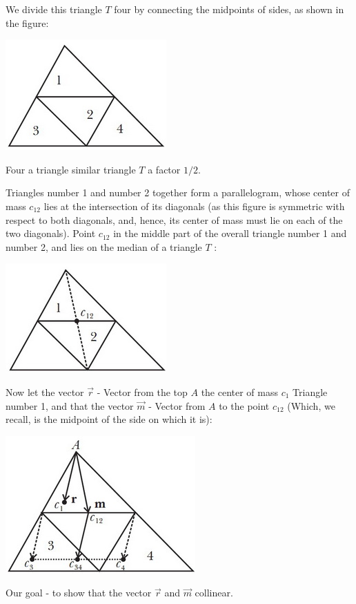 We divide this triangle $T$ four by connecting the midpoints of sides, as shown in the figure:

\includegraphics[scale=0.5]{1.jpg}

Four a triangle similar triangle $T$ a factor $1/2$.

Triangles number 1 and number 2 together form a parallelogram, whose center of mass $c_ {12}$ lies at the intersection of its diagonals (as this figure is symmetric with respect to both diagonals, and, hence, its center of mass must lie on each of the two diagonals). Point $c_ {12}$ in the middle part of the overall triangle number 1 and number 2, and lies on the median of a triangle $T$ :

\includegraphics[scale=0.5]{2.jpg}

Now let the vector $\vec {r}$ - Vector from the top $A$ the center of mass $c_1$ Triangle number 1, and that the vector $\vec {m}$ - Vector from $A$ to the point $c_ {12}$ (Which, we recall, is the midpoint of the side on which it is):

\includegraphics[scale=0.5]{3.jpg}

Our goal - to show that the vector $\vec {r}$ and $\vec {m}$ collinear.

